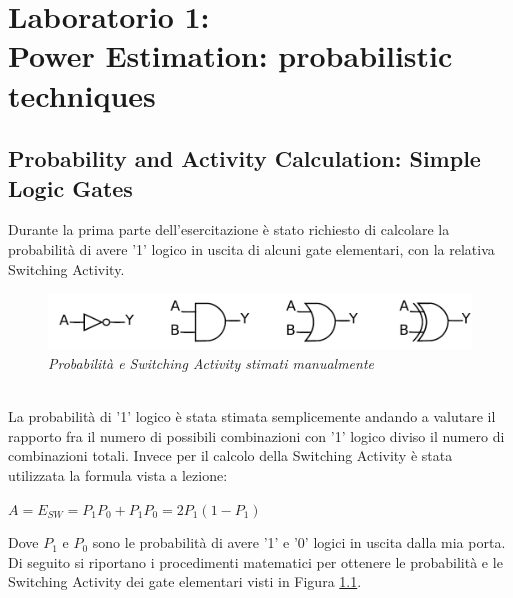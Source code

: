 \chapter{Laboratorio 1: \\Power Estimation: probabilistic techniques}
\section{Probability and Activity Calculation: Simple Logic Gates}
Durante la prima parte dell'esercitazione è stato richiesto di calcolare la probabilità di avere '1' logico in uscita di alcuni gate elementari, con la relativa Switching Activity.
\begin{figure}[!htb]
	\centering
	\includegraphics[scale=0.8]{immagini/gate}
	\caption{\textit{Probabilità e Switching Activity stimati manualmente}}
	\label{fig1_1}
\end{figure} \\
La probabilità di '1' logico è stata stimata semplicemente andando a valutare il rapporto fra il numero di possibili combinazioni con '1' logico diviso il numero di combinazioni totali. Invece per il calcolo della Switching Activity è stata utilizzata la formula vista a lezione:
\begin{center}
	$ A=E_{SW}=P_{1}P_{0}+P_{1}P_{0}=2P_{1}(1-P_{1}) $
\end{center}
Dove $P_{1}$ e $P_{0}$ sono le probabilità di avere '1' e '0' logici in uscita dalla mia porta. \\
Di seguito si riportano i procedimenti matematici per ottenere le probabilità e le Switching Activity dei gate elementari visti in Figura \ref{fig1_1}.\\
